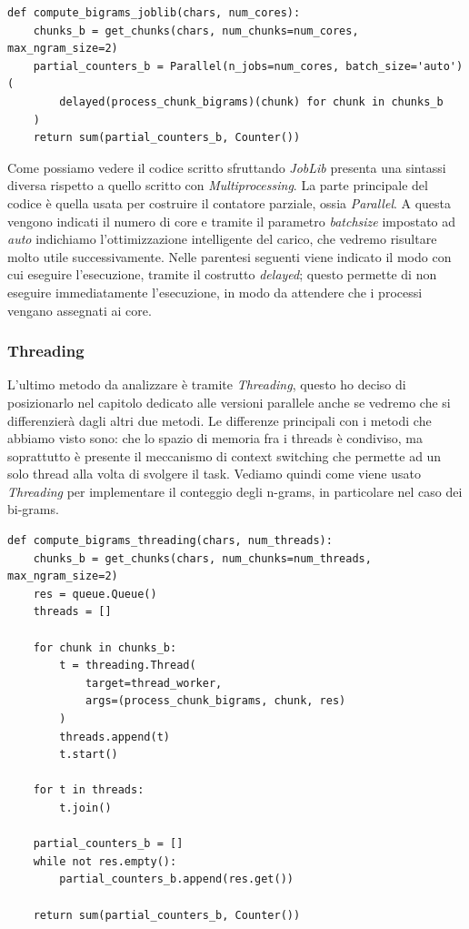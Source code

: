 \documentclass[10pt,twocolumn,letterpaper]{article}
\begin{document}
\begin{lstlisting}[caption={Calcolo degi n-grams con JobLib.}]
def compute_bigrams_joblib(chars, num_cores):
    chunks_b = get_chunks(chars, num_chunks=num_cores, max_ngram_size=2)
    partial_counters_b = Parallel(n_jobs=num_cores, batch_size='auto')(
        delayed(process_chunk_bigrams)(chunk) for chunk in chunks_b
    )
    return sum(partial_counters_b, Counter())
\end{lstlisting}

Come possiamo vedere il codice scritto sfruttando \textit{JobLib} presenta una sintassi diversa rispetto a quello scritto con \textit{Multiprocessing}. La parte principale del codice è quella usata per costruire il contatore parziale, ossia \textit{Parallel}. A questa vengono indicati il numero di core e tramite il parametro \textit{batchsize} impostato ad \textit{auto} indichiamo l'ottimizzazione intelligente del carico, che vedremo risultare molto utile successivamente. Nelle parentesi seguenti viene indicato il modo con cui eseguire l'esecuzione, tramite il costrutto \textit{delayed}; questo permette di non eseguire immediatamente l'esecuzione, in modo da attendere che i processi vengano assegnati ai core.

\subsubsection{Threading}
L'ultimo metodo da analizzare è tramite \textit{Threading}, questo ho deciso di posizionarlo nel capitolo dedicato alle versioni parallele anche se vedremo che si differenzierà dagli altri due metodi. Le differenze principali con i metodi che abbiamo visto sono: che lo spazio di memoria fra i threads è condiviso, ma soprattutto è presente il meccanismo di context switching che permette ad un solo thread alla volta di svolgere il task.
Vediamo quindi come viene usato \textit{Threading} per implementare il conteggio degli n-grams, in particolare nel caso dei bi-grams.


\begin{lstlisting}[caption={Calcolo degi n-grams con JobLib.}]
def compute_bigrams_threading(chars, num_threads):
    chunks_b = get_chunks(chars, num_chunks=num_threads, max_ngram_size=2)
    res = queue.Queue()
    threads = []

    for chunk in chunks_b:
        t = threading.Thread(
            target=thread_worker, 
            args=(process_chunk_bigrams, chunk, res)
        )
        threads.append(t)
        t.start()
        
    for t in threads:
        t.join()

    partial_counters_b = []
    while not res.empty():
        partial_counters_b.append(res.get())
        
    return sum(partial_counters_b, Counter())
\end{lstlisting}
\end{document}
